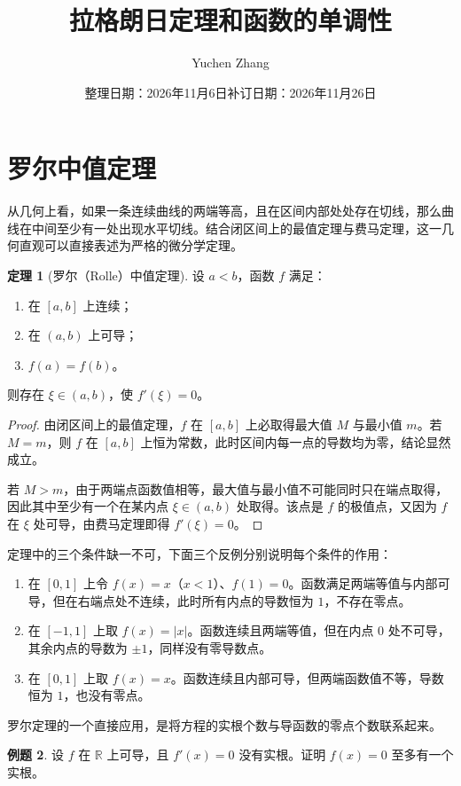 \documentclass[UTF8,fontset=fandol,a4paper,12pt]{ctexart}
\title{拉格朗日定理和函数的单调性}
\author{Yuchen Zhang}
\date{整理日期：2026年11月6日\quad 补订日期：2026年11月26日}
\makeatletter
\newcommand{\R}{\mathbb R}
\theoremstyle{definition}
\newtheorem{theorem}{定理}[section]
\newtheorem{example}[theorem]{例题}
\renewcommand{\maketitle}{\begin{center}{\LARGE\bfseries\@title\par}\vspace{0.6em}\@author\par\vspace{0.2em}{\small\@date\par}\end{center}}
\makeatother
\begin{document}
\maketitle

\section{罗尔中值定理}
从几何上看，如果一条连续曲线的两端等高，且在区间内部处处存在切线，那么曲线在中间至少有一处出现水平切线。结合闭区间上的最值定理与费马定理，这一几何直观可以直接表述为严格的微分学定理。

\begin{theorem}[罗尔（Rolle）中值定理]
设 $a<b$，函数 $f$ 满足：
\begin{enumerate}
\item 在 $[a,b]$ 上连续；
\item 在 $(a,b)$ 上可导；
\item $f(a)=f(b)$。
\end{enumerate}
则存在 $\xi\in(a,b)$，使 $f'(\xi)=0$。
\end{theorem}

\begin{proof}
由闭区间上的最值定理，$f$ 在 $[a,b]$ 上必取得最大值 $M$ 与最小值 $m$。若 $M=m$，则 $f$ 在 $[a,b]$ 上恒为常数，此时区间内每一点的导数均为零，结论显然成立。

若 $M>m$，由于两端点函数值相等，最大值与最小值不可能同时只在端点取得，因此其中至少有一个在某内点 $\xi\in(a,b)$ 处取得。该点是 $f$ 的极值点，又因为 $f$ 在 $\xi$ 处可导，由费马定理即得 $f'(\xi)=0$。
\end{proof}

定理中的三个条件缺一不可，下面三个反例分别说明每个条件的作用：
\begin{enumerate}
\item 在 $[0,1]$ 上令 $f(x)=x$（$x<1$）、$f(1)=0$。函数满足两端等值与内部可导，但在右端点处不连续，此时所有内点的导数恒为 $1$，不存在零点。
\item 在 $[-1,1]$ 上取 $f(x)=|x|$。函数连续且两端等值，但在内点 $0$ 处不可导，其余内点的导数为 $\pm1$，同样没有零导数点。
\item 在 $[0,1]$ 上取 $f(x)=x$。函数连续且内部可导，但两端函数值不等，导数恒为 $1$，也没有零点。
\end{enumerate}

罗尔定理的一个直接应用，是将方程的实根个数与导函数的零点个数联系起来。

\begin{example}
设 $f$ 在 $\R$ 上可导，且 $f'(x)=0$ 没有实根。证明 $f(x)=0$ 至多有一个实根。
\end{example}
\end{document}
